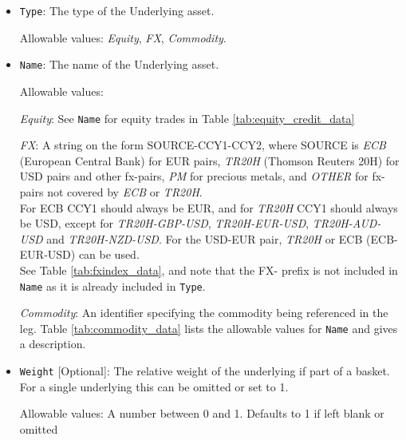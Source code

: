 \begin{itemize}

\item \lstinline!Type!: The type of the Underlying asset.

  Allowable values:  \emph{Equity}, \emph{FX}, \emph{Commodity}.

\item \lstinline!Name!:
  The name of the Underlying asset. 
  
  Allowable values:  

  \emph{Equity}: See \lstinline!Name! for equity trades in Table \ref{tab:equity_credit_data}

  \emph{FX}: A string on the form SOURCE-CCY1-CCY2, where SOURCE is \emph{ECB} (European Central Bank) for EUR pairs, \emph{TR20H} (Thomson Reuters 20H) for USD pairs and other fx-pairs,  \emph{PM} for precious metals, and \emph{OTHER} for fx-pairs not covered by \emph{ECB} or \emph{TR20H}. \\ For ECB CCY1 should always be EUR, and for \emph{TR20H} CCY1 should always be USD, except for
  \emph{TR20H-GBP-USD}, \emph{TR20H-EUR-USD}, \emph{TR20H-AUD-USD} and \emph{TR20H-NZD-USD}. For the USD-EUR pair, \emph{TR20H} or ECB (ECB-EUR-USD) can be used. \\ See Table
  \ref{tab:fxindex_data}, and note that the FX- prefix is not included in \lstinline!Name! as it is already included in \lstinline!Type!.

  \emph{Commodity}: An identifier specifying the commodity being referenced in the leg.
Table \ref{tab:commodity_data} lists the allowable values for \lstinline!Name! and gives a description. \\
\item \lstinline!Weight! [Optional]:
The relative weight of the underlying if part of a basket. For a single underlying this can be omitted or set to 1. 

Allowable values: A number between 0 and 1. Defaults to 1 if left blank or omitted


\end{itemize}
